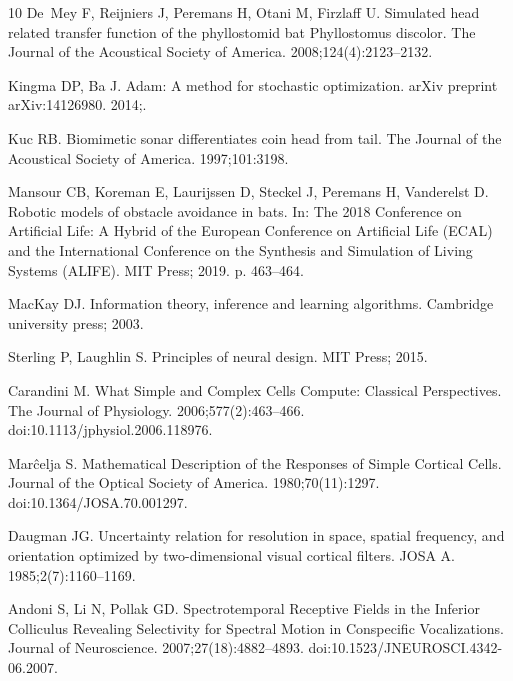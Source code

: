 \documentclass[10pt,letterpaper]{article}
\begin{document}
\begin{thebibliography}{10}
	De~Mey F, Reijniers J, Peremans H, Otani M, Firzlaff U.
	\newblock Simulated head related transfer function of the phyllostomid bat
	Phyllostomus discolor.
	\newblock The Journal of the Acoustical Society of America.
	2008;124(4):2123--2132.
	
	Kingma DP, Ba J.
	\newblock Adam: A method for stochastic optimization.
	\newblock arXiv preprint arXiv:14126980. 2014;.
	
	Kuc RB.
	\newblock Biomimetic sonar differentiates coin head from tail.
	\newblock The Journal of the Acoustical Society of America. 1997;101:3198.
	
	Mansour CB, Koreman E, Laurijssen D, Steckel J, Peremans H, Vanderelst D.
	\newblock Robotic models of obstacle avoidance in bats.
	\newblock In: The 2018 Conference on Artificial Life: A Hybrid of the European
	Conference on Artificial Life (ECAL) and the International Conference on the
	Synthesis and Simulation of Living Systems (ALIFE). MIT Press; 2019. p.
	463--464.
	
	MacKay DJ.
	\newblock Information theory, inference and learning algorithms.
	\newblock Cambridge university press; 2003.
	
	Sterling P, Laughlin S.
	\newblock Principles of neural design.
	\newblock MIT Press; 2015.
	
	Carandini M.
	\newblock What Simple and Complex Cells Compute: {{Classical Perspectives}}.
	\newblock The Journal of Physiology. 2006;577(2):463--466.
	\newblock doi:{10.1113/jphysiol.2006.118976}.
	
	Mar{\^c}elja S.
	\newblock Mathematical Description of the Responses of Simple Cortical Cells.
	\newblock Journal of the Optical Society of America. 1980;70(11):1297.
	\newblock doi:{10.1364/JOSA.70.001297}.
	
	Daugman JG.
	\newblock Uncertainty relation for resolution in space, spatial frequency, and
	orientation optimized by two-dimensional visual cortical filters.
	\newblock JOSA A. 1985;2(7):1160--1169.
	
	Andoni S, Li N, Pollak GD.
	\newblock Spectrotemporal {{Receptive Fields}} in the {{Inferior Colliculus
			Revealing Selectivity}} for {{Spectral Motion}} in {{Conspecific
			Vocalizations}}.
	\newblock Journal of Neuroscience. 2007;27(18):4882--4893.
	\newblock doi:{10.1523/JNEUROSCI.4342-06.2007}.
	

\end{thebibliography}
\end{document}
